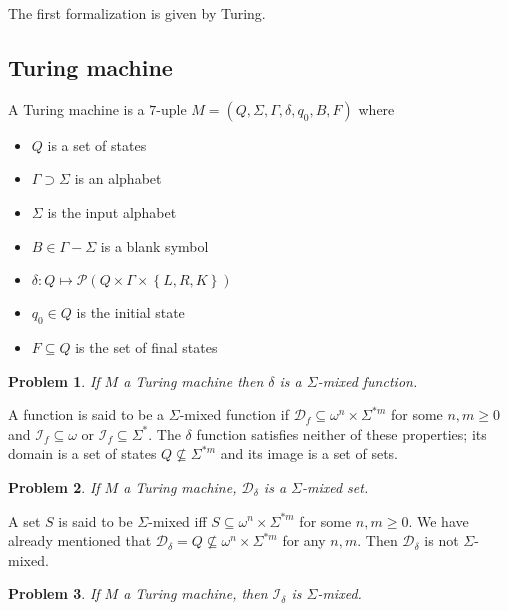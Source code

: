 \documentclass[a4paper, 12pt]{article}
\newtheorem{problem}{Problem}
\newtheorem{problem}{Problem}
\begin{document}
The first formalization is given by Turing.

\subsection{Turing machine}

A Turing machine is a $7$-uple $M = \left( Q, \Sigma, \Gamma, \delta, q_0, B, F
\right) $ where

\begin{itemize}
    \item $Q$ is a set of states 
    \item $\Gamma \supset \Sigma$ is an alphabet
    \item $\Sigma$ is the input alphabet
    \item $B \in \Gamma - \Sigma$ is a blank symbol 
    \item $\delta : Q \mapsto \mathcal{P} \left( Q \times \Gamma \times \left\{
        L, R, K\right\}  \right) $ 
    \item $q_0 \in Q$ is the initial state 
    \item $F \subseteq Q$ is the set of final states
\end{itemize}

\begin{problem}
    If $M$ a Turing machine then $\delta$ is a $\Sigma$-mixed function.
\end{problem}

A function is said to be a $\Sigma$-mixed function if $\mathcal{D}_f \subseteq
\omega^n \times \Sigma^{*m}$ for some $n, m \geq 0$ and $\mathcal{I}_f \subseteq
\omega$ or $\mathcal{I}_f \subseteq \Sigma^{*}$. The $\delta$ function satisfies
neither of these properties; its domain is a set of states $Q \not\subseteq
\Sigma^{*m}$ and its image is a set of sets.

\begin{problem}
    If $M$ a Turing machine, $\mathcal{D}_{\delta}$ is a $\Sigma$-mixed set.
\end{problem}

A set $S$ is said to be $\Sigma$-mixed iff $S \subseteq \omega^n \times
\Sigma^{*m}$ for some $n, m \geq 0$. We have already mentioned that
$\mathcal{D}_\delta = Q \not\subseteq \omega^n \times \Sigma^{*m}$ for any $n,
m$. Then $\mathcal{D}_\delta$ is not $\Sigma$-mixed.

\begin{problem}
    If $M$ a Turing machine, then $\mathcal{I}_{\delta}$ is $\Sigma$-mixed.
\end{problem}
\end{document}
